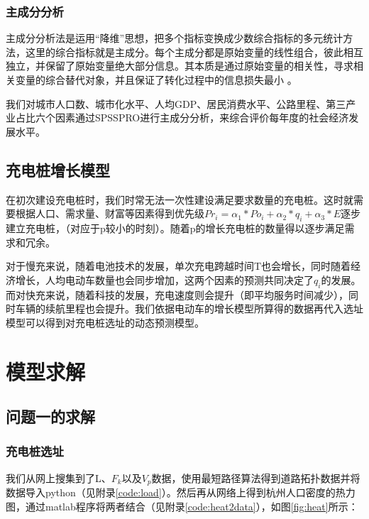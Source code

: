 \documentclass[12pt, a4paper, oneside]{ctexart}
\begin{document}
\subsubsection{主成分分析}
主成分分析法是运用“降维”思想，把多个指标变换成少数综合指标的多元统计方法，这里的综合指标就是主成分。每个主成分都是原始变量的线性组合，彼此相互独立，并保留了原始变量绝大部分信息。其本质是通过原始变量的相关性，寻求相关变量的综合替代对象，并且保证了转化过程中的信息损失最小 。

我们对城市人口数、城市化水平、人均GDP、居民消费水平、公路里程、第三产业占比六个因素通过SPSSPRO进行主成分分析，来综合评价每年度的社会经济发展水平。

\subsection{充电桩增长模型}
在初次建设充电桩时，我们时常无法一次性建设满足要求数量的充电桩。这时就需要根据人口、需求量、财富等因素得到优先级\(Pr_i=\alpha_1*Po_i+\alpha_2*q_i+\alpha_3*E\)逐步建立充电桩，（对应于p较小的时刻）。随着p的增长充电桩的数量得以逐步满足需求和冗余。

对于慢充来说，随着电池技术的发展，单次充电跨越时间T也会增长，同时随着经济增长，人均电动车数量也会同步增加，这两个因素的预测共同决定了\(q_i\)的发展。而对快充来说，随着科技的发展，充电速度则会提升（即平均服务时间减少），同时车辆的续航里程也会提升。我们依据电动车的增长模型所算得的数据再代入选址模型可以得到对充电桩选址的动态预测模型。
\section{模型求解}
\subsection{问题一的求解}
\subsubsection{充电桩选址}
我们从网上搜集到了L、\(F_k\)以及\(V_p\)数据，使用最短路径算法得到道路拓扑数据并将数据导入python（见附录\ref{code:load}）。然后再从网络上得到杭州人口密度的热力图，通过matlab程序将两者结合（见附录\ref{code:heat2data}），如图\ref{fig:heat}所示：
\end{document}

